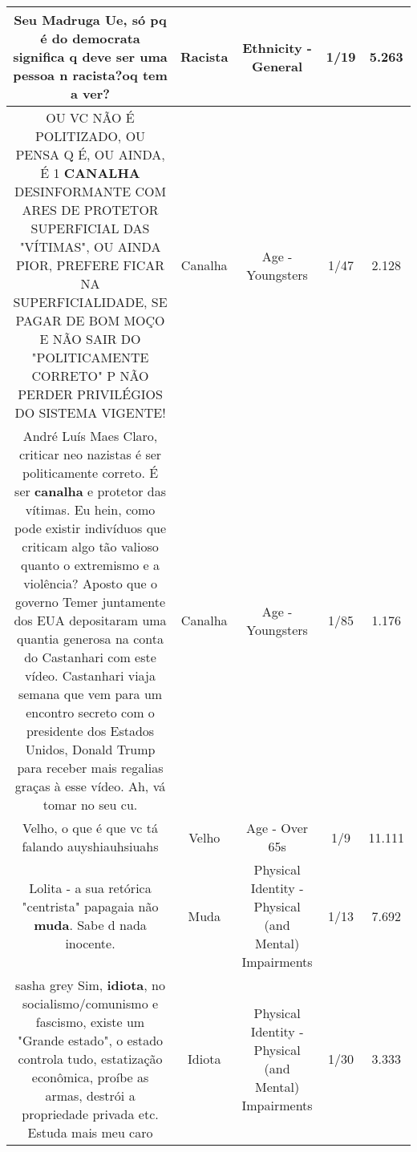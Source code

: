 \documentclass[11pt]{article}
\newlength\mylength
\begin{document}
\begin{center}
\begin{longtable}{|C{.65\mylength}|C{.30\mylength}|C{.12\mylength}|C{.12\mylength}|C{.12\mylength}|}
  \small Seu Madruga Ue, só pq é do democrata significa q deve ser uma pessoa n \textbf{racista}?oq tem a ver?\normalsize   & Racista & Ethnicity - General & 1/19 & 5.263 \\  \hline
  \small OU VC NÃO É POLITIZADO, OU PENSA Q É, OU AINDA, É 1 \textbf{CANALHA} DESINFORMANTE COM ARES DE PROTETOR SUPERFICIAL DAS "VÍTIMAS", OU AINDA PIOR, PREFERE FICAR NA SUPERFICIALIDADE, SE PAGAR DE BOM MOÇO E NÃO SAIR DO "POLITICAMENTE CORRETO" P NÃO PERDER PRIVILÉGIOS DO SISTEMA VIGENTE!\normalsize   & Canalha & Age - Youngsters & 1/47 & 2.128 \\  \hline
  \small André Luís Maes Claro, criticar neo nazistas é ser politicamente correto. É ser \textbf{canalha} e protetor das vítimas. Eu hein, como pode existir indivíduos que criticam algo tão valioso quanto o extremismo e a violência? Aposto que o governo Temer juntamente dos EUA depositaram uma quantia generosa na conta do Castanhari com este vídeo. Castanhari viaja semana que vem para um encontro secreto com o presidente dos Estados Unidos, Donald Trump para receber mais regalias graças à esse vídeo. Ah, vá tomar no seu cu.\normalsize   & Canalha & Age - Youngsters & 1/85 & 1.176 \\  \hline
  \small Velho, o que é que vc tá falando auyshiauhsiuahs\normalsize   & Velho & Age - Over 65s & 1/9 & 11.111 \\  \hline
  \small Lolita -  a sua retórica "centrista" papagaia não \textbf{muda}. Sabe d nada inocente.\normalsize   & Muda & Physical Identity - Physical (and Mental) Impairments & 1/13 & 7.692 \\  \hline
  \small sasha grey Sim, \textbf{idiota}, no socialismo/comunismo e fascismo, existe um "Grande estado", o estado controla tudo, estatização econômica, proíbe as armas, destrói a propriedade privada etc. Estuda mais meu caro\normalsize   & Idiota & Physical Identity - Physical (and Mental) Impairments & 1/30 & 3.333 \\  \hline

\end{longtable}
\end{center}
\end{document}

